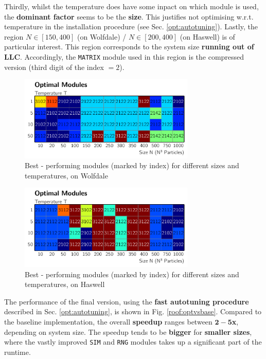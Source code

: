 \documentclass[letterpaper]{article}
\begin{document}
Thirdly, whilst the temperature does have some inpact on which module is used, the \textbf{dominant factor} seems to be the \textbf{size}. This justifies not optimising w.r.t. temperature in the installation procedure (see Sec. \ref{opt:autotuning}).\newline
Lastly, the region $N \in [150,400]$ (on Wolfdale) / $N \in [200,400]$ (on Haswell) is of particular interest. This region corresponds to the system size \textbf{running out of LLC}. Accordingly, the \texttt{MATRIX} module used in this region is the compressed version (third digit of the index $=2$).
	\begin{figure}[h]\centering
	  \includegraphics[width = 8.36cm]{plots/module_msk2.pdf}
	  \caption{Best - performing modules (marked by index) for different sizes and temperatures, on Wolfdale}
	  \label{mod:Wolf}
	\end{figure}
	\begin{figure}[h]\centering
		  \includegraphics[width = 8.36cm]{plots/module_dg2.pdf}
		  \caption{Best - performing modules (marked by index) for different sizes and temperatures, on Haswell}
		  \label{mod,Has}
	\end{figure}\newline
The performance of the final version, using the \textbf{fast autotuning procedure} described in Sec. \ref{opt:autotuning}, is shown in Fig. \ref{roof:optvsbase}. Compared to the baseline implementation, the overall \textbf{speedup} ranges between \textbf{$\mathbf{2 - 5}$x}, depending on system size. The speedup tends to be \textbf{bigger} for \textbf{smaller sizes}, where the vastly improved \texttt{SIM} and \texttt{RNG} modules takes up a significant part of the runtime. 
\end{document}
